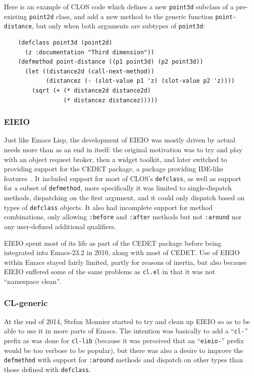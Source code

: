 \documentclass[format=acmsmall, review]{acmart}
\newcommand \Elisp {Emacs Lisp}
\begin{document}
Here is an example of CLOS code which defines a new \texttt{point3d} subclass
of a pre-existing \texttt{point2d} class, and add a new method to the
generic function \texttt{point-distance}, but only when both
arguments are subtypes of \texttt{point3d}:
\begin{verbatim}
    (defclass point3d (point2d)
      (z :documentation "Third dimension"))
    (defmethod point-distance ((p1 point3d) (p2 point3d))
      (let ((distance2d (call-next-method))
            (distancez (- (slot-value p1 'z) (slot-value p2 'z))))
        (sqrt (+ (* distance2d distance2d)
                 (* distancez distancez)))))
\end{verbatim}

\subsubsection{EIEIO}

Just like \Elisp{}, the development of EIEIO was mostly
driven by actual needs more than as an end in itself: the original
motivation was to try and play with an object request broker, then a widget
toolkit, and later switched to providing support for the CEDET
package, a package providing IDE-like features~\cite{Ludlam18}.
It included support for most of CLOS's \texttt{defclass}, as well as support
for a subset of \texttt{defmethod}, more specifically it was limited to
single-dispatch methods, dispatching on the first argument, and it could
only dispatch based on types of \texttt{defclass} objects.  It also had
incomplete support for method combinations, only allowing \texttt{:before}
and \texttt{:after} methods but not \texttt{:around} nor any user-defined
additional qualifiers.

EIEIO spent most of its life as part of the CEDET package
before being integrated into Emacs-23.2 in
2010, along with most of CEDET.  Use of EIEIO within Emacs stayed fairly
limited, partly for reasons of inertia, but also because EIEIO suffered some
of the same problems as \texttt{cl.el} in that it was not
``namespace clean''.

\subsubsection{CL-generic}

At the end of 2014, Stefan Monnier started to try and clean up EIEIO so as
to be able to use it in more parts of Emacs.  The intention was basically to
add a ``\texttt{cl-}'' prefix as was done for \texttt{cl-lib} (because it
was perceived that an ``\texttt{eieio-}'' prefix would be too verbose to be
popular), but there was also a desire to improve the \texttt{defmethod} with
support for \texttt{:around} methods and dispatch on other types than those
defined with \texttt{defclass}.
\end{document}
